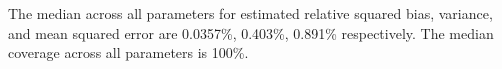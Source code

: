 The median across all parameters for  estimated relative squared bias, variance, and mean squared error are 0.0357\%, 0.403\%, 0.891\% respectively. The median coverage across all parameters is 100\%.